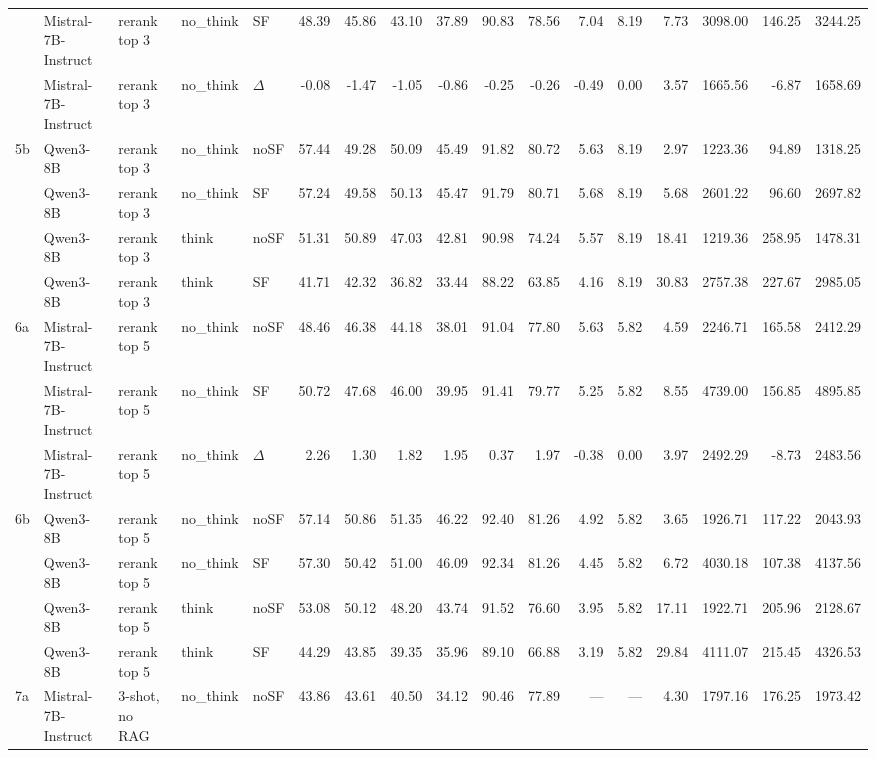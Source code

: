 \begin{landscape}
\begin{footnotesize}
\begin{longtable}{l l l l l r r r r r r r r r r r r}
 & Mistral-7B-Instruct & rerank top 3 & no\_think & SF & 48.39 & 45.86 & 43.10 & 37.89 & 90.83 & 78.56 & 7.04 & 8.19 & 7.73 & 3098.00 & 146.25 & 3244.25 \\
 & Mistral-7B-Instruct & rerank top 3 & no\_think & $\Delta$ & -0.08 & -1.47 & -1.05 & -0.86 & -0.25 & -0.26 & -0.49 & 0.00 & 3.57 & 1665.56 & -6.87 & 1658.69 \\
5b & Qwen3-8B & rerank top 3 & no\_think & noSF & 57.44 & 49.28 & 50.09 & 45.49 & 91.82 & 80.72 & 5.63 & 8.19 & 2.97 & 1223.36 & 94.89 & 1318.25 \\
 & Qwen3-8B & rerank top 3 & no\_think & SF & 57.24 & 49.58 & 50.13 & 45.47 & 91.79 & 80.71 & 5.68 & 8.19 & 5.68 & 2601.22 & 96.60 & 2697.82 \\
 & Qwen3-8B & rerank top 3 & think & noSF & 51.31 & 50.89 & 47.03 & 42.81 & 90.98 & 74.24 & 5.57 & 8.19 & 18.41 & 1219.36 & 258.95 & 1478.31 \\
 & Qwen3-8B & rerank top 3 & think & SF & 41.71 & 42.32 & 36.82 & 33.44 & 88.22 & 63.85 & 4.16 & 8.19 & 30.83 & 2757.38 & 227.67 & 2985.05 \\
\midrule
6a & Mistral-7B-Instruct & rerank top 5 & no\_think & noSF & 48.46 & 46.38 & 44.18 & 38.01 & 91.04 & 77.80 & 5.63 & 5.82 & 4.59 & 2246.71 & 165.58 & 2412.29 \\
 & Mistral-7B-Instruct & rerank top 5 & no\_think & SF & 50.72 & 47.68 & 46.00 & 39.95 & 91.41 & 79.77 & 5.25 & 5.82 & 8.55 & 4739.00 & 156.85 & 4895.85 \\
 & Mistral-7B-Instruct & rerank top 5 & no\_think & $\Delta$ & 2.26 & 1.30 & 1.82 & 1.95 & 0.37 & 1.97 & -0.38 & 0.00 & 3.97 & 2492.29 & -8.73 & 2483.56 \\
6b & Qwen3-8B & rerank top 5 & no\_think & noSF & 57.14 & 50.86 & 51.35 & 46.22 & 92.40 & 81.26 & 4.92 & 5.82 & 3.65 & 1926.71 & 117.22 & 2043.93 \\
 & Qwen3-8B & rerank top 5 & no\_think & SF & 57.30 & 50.42 & 51.00 & 46.09 & 92.34 & 81.26 & 4.45 & 5.82 & 6.72 & 4030.18 & 107.38 & 4137.56 \\
 & Qwen3-8B & rerank top 5 & think & noSF & 53.08 & 50.12 & 48.20 & 43.74 & 91.52 & 76.60 & 3.95 & 5.82 & 17.11 & 1922.71 & 205.96 & 2128.67 \\
 & Qwen3-8B & rerank top 5 & think & SF & 44.29 & 43.85 & 39.35 & 35.96 & 89.10 & 66.88 & 3.19 & 5.82 & 29.84 & 4111.07 & 215.45 & 4326.53 \\
\midrule
7a & Mistral-7B-Instruct & 3-shot, no RAG & no\_think & noSF & 43.86 & 43.61 & 40.50 & 34.12 & 90.46 & 77.89 & --- & --- & 4.30 & 1797.16 & 176.25 & 1973.42 \\

\end{longtable}
\end{footnotesize}
\end{landscape}
